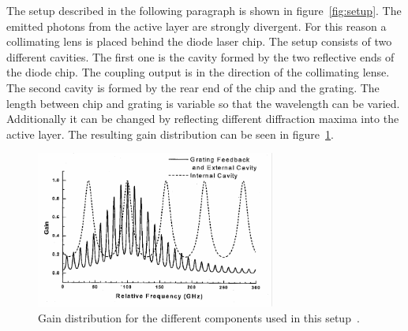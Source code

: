 The setup described in the following paragraph is shown in figure~\ref{fig:setup}.
The emitted photons from the active layer are strongly divergent. For this reason
a collimating lens is placed behind the diode laser chip. The setup consists of
two different cavities. The first one is the cavity formed by the two reflective ends
of the diode chip. The coupling output is in the direction of the collimating lense.
The second cavity is formed by the rear end of the chip and the grating. The length
between chip and grating is variable so that the wavelength can be varied. Additionally
it can be changed by reflecting different diffraction maxima into the active layer.
The resulting gain distribution can be seen in figure~\ref{fig:gain}.
\begin{figure}
  \centering
  \includegraphics[width = 0.7\textwidth]{Pics/gain.pdf}
  \caption{Gain distribution for the different components used in this setup~\cite{anleitung}.}
  \label{fig:gain}
\end{figure}
